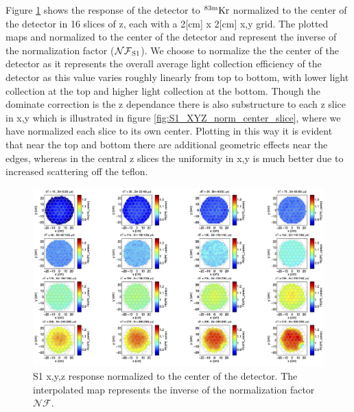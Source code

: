Figure \ref{fig:S1_XYZ_norm_center} shows the response of the detector to $\rm^{83m}Kr$ normalized to the center of the detector in 16 slices of z, each with a 2[cm] x 2[cm] x,y grid. The plotted maps and normalized to the center of the detector and represent the inverse of the normalization factor ($\rm \mathcal{NF}_{S1}$). We choose to normalize the the center of the detector as it represents the overall average light collection efficiency of the detector as this value varies roughly linearly from top to bottom, with lower light collection at the top and higher light collection at the bottom. Though the dominate correction is the z dependance there is also substructure to each z slice in x,y which is illustrated in figure \ref{fig:S1_XYZ_norm_center_slice}, where we have normalized each slice to its own center. Plotting in this way it is evident that near the top and bottom there are additional geometric effects near the edges, whereas in the central z slices the uniformity in x,y is much better due to increased scattering off the teflon.

\begin{figure}[h!]\centering
\includegraphics[width=150mm]{Chapter_XYZ_Corr/Thesis_Corr_Plots/S1_XYZ_Kr_norm_center_crop_80.png}
\caption{S1 x,y,z response normalized to the center of the detector. The interpolated map represents the inverse of the normalization factor $\mathcal{NF}$. }
\label{fig:S1_XYZ_norm_center}
\end{figure}

